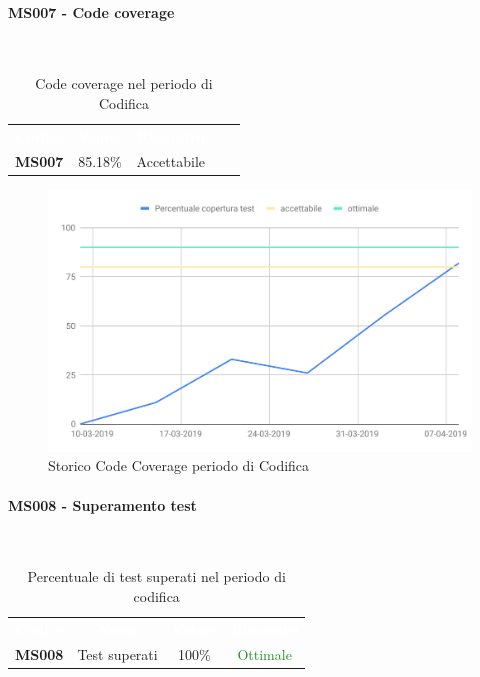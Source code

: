 \paragraph{MS007 - Code coverage}\mbox{}\\[0,3cm]
    \begin{table}[H]
        \centering
        \begin{tabular}{ccccc}
            \rowcolor{greySWEight}
            \textcolor{white}{\textbf{Codice}} &
            \textcolor{white}{\textbf{Valore}}&
            \textcolor{white}{\textbf{Riscontro}}\\
            \textbf{MS007} & 85.18\% & \textcolor{YellowOrange}{Accettabile}\\
        \end{tabular}
        \caption{Code coverage nel periodo di Codifica}
    \end{table}
    \begin{figure}[H]
        \centering
        \includegraphics[width=0.7\linewidth]{sez/App_Esito/Qualifica/graph/storicoCodeCoverage.pdf}
        \caption{Storico Code Coverage periodo di Codifica}
    \end{figure}

\paragraph{MS008 - Superamento test}\mbox{}\\[0,3cm]
    \begin{table}[H]
        \centering
        \begin{tabular}{cccc}
        \rowcolor{greySWEight}
        \textcolor{white}{\textbf{Codice}} &
        \textcolor{white}{\textbf{Nome}} &
        \textcolor{white}{\textbf{Valore}} &
        \textcolor{white}{\textbf{Riscontro}}\\
        \textbf{MS008}& Test superati & 100\% & \textcolor{ForestGreen}{Ottimale} \\

        \end{tabular}
        \caption{Percentuale di test superati nel periodo di codifica}
    \end{table}

